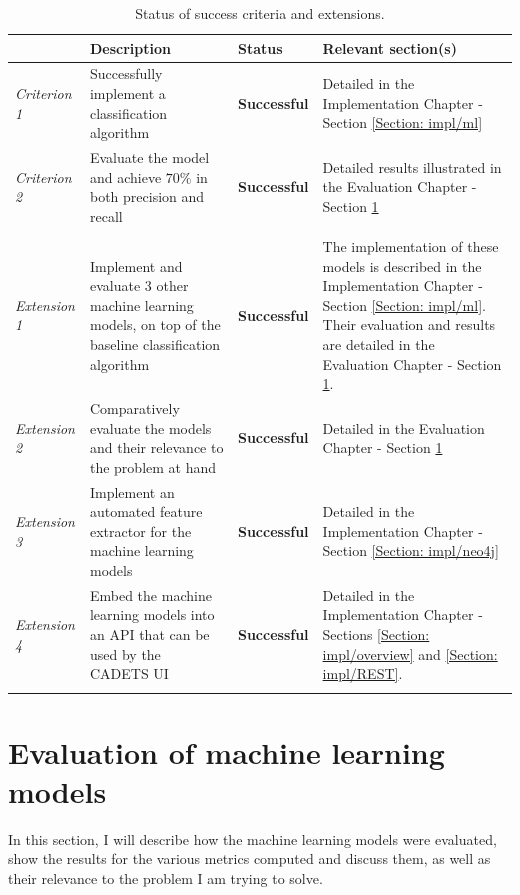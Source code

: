 		\begin{longtable}{|p{}|p{}|p{}|p{}|}
			\hline
			& \textbf{Description} & \textbf{Status} & \textbf{Relevant section(s)} \\
			\hline
			\textit{Criterion 1} & Successfully implement a classification algorithm & \textbf{Successful} & Detailed in the Implementation Chapter - Section \ref{Section: impl/ml} \\
			\hline
			\textit{Criterion 2} & Evaluate the model and achieve $70\%$ in both precision and recall & \textbf{Successful} & Detailed results illustrated in the Evaluation Chapter - Section \ref{Section: eval/ml} \\
			\hhline{====}
			\multicolumn{4}{|c|}{\textbf{Extensions}} \\
			\hhline{====}
			\textit{Extension 1} & Implement and evaluate 3 other machine learning models, on top of the baseline classification algorithm & \textbf{Successful} & The implementation of these models is described in the Implementation Chapter - Section \ref{Section: impl/ml}. Their evaluation and results are detailed in the Evaluation Chapter - Section \ref{Section: eval/ml}.\\
			\hline
			\textit{Extension 2} & Comparatively evaluate the models and their relevance to the problem at hand & \textbf{Successful} & Detailed in the Evaluation Chapter - Section \ref{Section: eval/ml} \\
			\hline
			\textit{Extension 3} & Implement an automated feature extractor for the machine learning models & \textbf{Successful} & Detailed in the Implementation Chapter - Section \ref{Section: impl/neo4j} \\
			\hline
			\textit{Extension 4} & Embed the machine learning models into an API that can be used by the CADETS UI & \textbf{Successful} & Detailed in the Implementation Chapter - Sections \ref{Section: impl/overview} and \ref{Section: impl/REST}. \\
			\hline
			\caption{Status of success criteria and extensions.}
			\label{Table: eval/success/status}
		\end{longtable}
		
	\section{Evaluation of machine learning models} \label{Section: eval/ml}
		In this section, I will describe how the machine learning models were evaluated, show the results for the various metrics computed and discuss them, as well as their relevance to the problem I am trying to solve.
		
